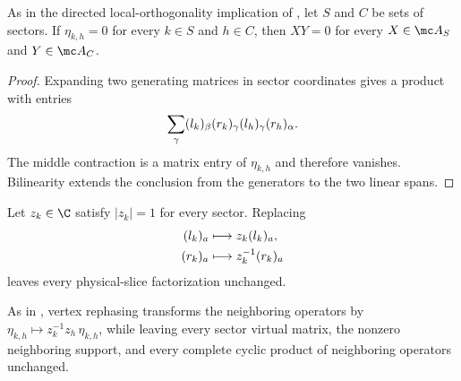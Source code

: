 \begin{lemma}%
    \label{thm:mpdo_directed_cut_one_site_spaces}
    \leanok
    As in the directed local-orthogonality implication of
    \cite[Appendix~C.2, lines~1463--1470]{Cirac2016MPDO_arXiv}, let $S$ and $C$
    be sets of sectors. If $\eta_{k,h}=0$ for every $k\in S$ and $h\in C$,
    then $XY=0$ for every $X\in\mc A_S$ and $Y\in\mc A_C$.
\end{lemma}

\begin{proof}
    \leanok
    Expanding two generating matrices in sector coordinates gives a product
    with entries
    \begin{align}
        \sum_{\gamma}
        (l_k)_\beta (r_k)_\gamma
        (l_h)_\gamma (r_h)_\alpha.
        \notag
    \end{align}
    The middle contraction is a matrix entry of $\eta_{k,h}$ and therefore
    vanishes. Bilinearity extends the conclusion from the generators to the
    two linear spans.
\end{proof}

\begin{definition}%
    \label{def:mpdo_physical_sector_rephasing}
    \leanok
    Let $z_k\in\C$ satisfy $|z_k|=1$ for every sector. Replacing
    \begin{align}
        (l_k)_a & \longmapsto z_k(l_k)_a,
        \notag                                \\
        (r_k)_a & \longmapsto z_k^{-1}(r_k)_a
        \notag
    \end{align}
    leaves every physical-slice factorization unchanged.
\end{definition}

\begin{lemma}%
    \label{thm:mpdo_physical_sector_rephasing_invariance}
    \leanok
    As in \cite[Appendix~C.2, lines~1434--1450]{Cirac2016MPDO_arXiv}, vertex
    rephasing transforms the neighboring operators by
    $\eta_{k,h}\longmapsto z_k^{-1}z_h\,\eta_{k,h}$, while leaving every sector
    virtual matrix, the nonzero neighboring support, and every complete cyclic
    product of neighboring operators unchanged.
\end{lemma}

